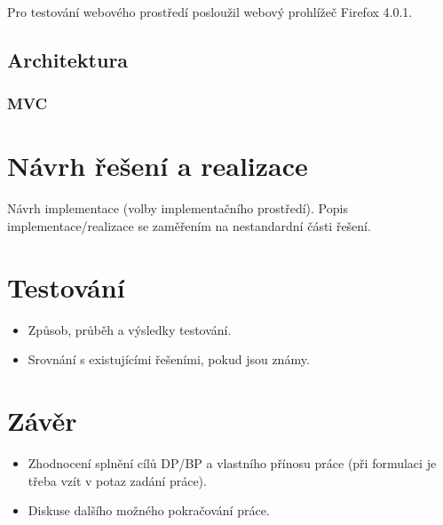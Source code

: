 \documentclass[11pt,twoside,a4paper]{book}
\begin{document}
Pro testování webového prostředí posloužil webový prohlížeč Firefox 4.0.1.

\section{Architektura}

\subsection{MVC}

\chapter{Návrh řešení a realizace}
Návrh implementace (volby implementačního prostředí).
Popis implementace/realizace se zaměřením na nestandardní části řešení.


\chapter{Testování}

\begin{itemize}
 \item Způsob, průběh a výsledky testování.
 \item Srovnání s existujícími řešeními, pokud jsou známy.
\end{itemize} 


\chapter{Závěr}

\begin{itemize}
\item Zhodnocení splnění cílů DP/BP a  vlastního přínosu práce (při formulaci je třeba vzít v potaz zadání práce).
\item Diskuse dalšího možného pokračování práce.
\end{itemize} 

\end{document}

